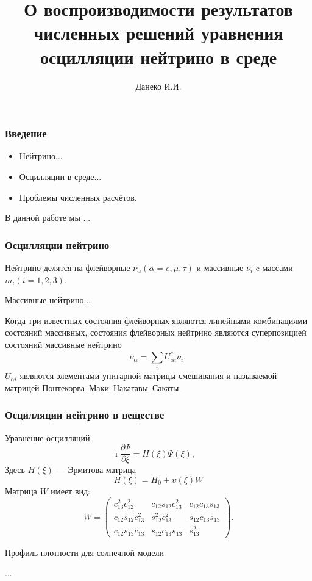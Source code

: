 \documentclass[utf8,9pt,mathserif,usepdftitle=false]{beamer}
\title{О воспроизводимости результатов численных решений уравнения осцилляции нейтрино в среде}%
\author{Данеко И.И.}
\date[ИГУ, 2025]{%
  20 октября 2025\\%
  \vspace*{10ex}%
  \begin{flushright}
    \small
    Научный руководитель: Ломов В.П.\par
  \end{flushright}
  {\vspace*{7ex}
    \footnotesize%
    Иркутск, ФГБОУ ВО ИГУ\par%
  } }
\begin{document}
\begin{frame}
  \titlepage
\end{frame}

\begin{frame}
  \frametitle{Введение}%
  \begin{itemize}
  \item<1-> Нейтрино...
  \item<2-> Осцилляции в среде...
  \item<3-> Проблемы численных расчётов.
  \end{itemize}
  В данной работе мы ...
\end{frame}

\begin{frame}
  \frametitle{Осцилляции нейтрино}%
  Нейтрино делятся на флейворные \({\nu_{\alpha}}(\alpha= e, \mu, \tau)\) и массивные \({\nu_{i}}\) c массами \(m_{i}(i=1,2,3)\).

  Массивные нейтрино...

  Когда три известных состояния флейворных являются линейными комбинациями состояний массивных, состояния флейворных нейтрино являются суперпозицией состояний массивные нейтрино
  \begin{equation}\label{eq:1}
  	{\nu_{\alpha}}=\sum_{i}U_{\alpha i}^{*}{\nu_{i}},
  \end{equation} 
  \(U_{\alpha i}\) являются элементами унитарной матрицы
  смешивания и называемой матрицей Понтекорва–Маки–Накагавы–Сакаты.
\end{frame}

\begin{frame}
  \frametitle{Осцилляции нейтрино в веществе}%
  Уравнение осцилляций
  \begin{equation*}
  	\imath \frac{\partial \Psi}{\partial \xi}=H(\xi)\Psi(\xi),\quad
  \end{equation*}
  Здесь \({H(\xi)}\) — Эрмитова матрица
  \begin{equation*}
  	H(\xi)=H_0+\upsilon(\xi)W
  \end{equation*}
  Матрица \(W\) имеет вид:
  \begin{equation}
  	W=
  	\begin{pmatrix}
  		c_{13}^{2}c_{12}^{2} & c_{12}s_{12}c_{13}^{2} & c_{12}c_{13}s_{13}\\
  		c_{12}s_{12}c_{13}^{2} & s_{12}^{2}c_{13}^{2} & s_{12}c_{13}s_{13}\\
  		c_{12}s_{13}c_{13} & s_{12}c_{13}s_{13} & s_{13}^{2}
  	\end{pmatrix}.
  \end{equation}

  Профиль плотности для солнечной модели

  ...
\end{frame}
\end{document}
